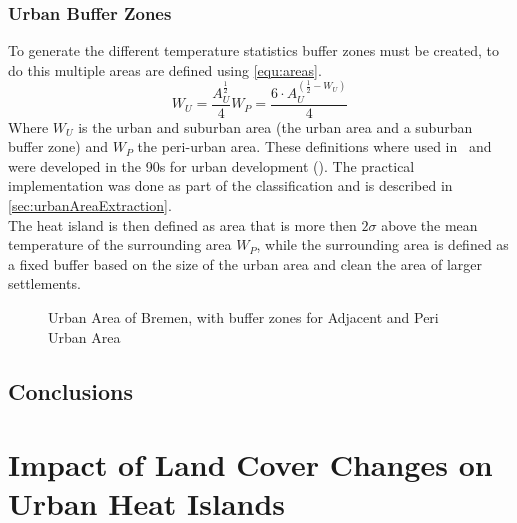 \documentclass[12pt,a4paper, english,twoside]{article}
\begin{document}
    \subsubsection{Urban Buffer Zones}\label{sec:urbanBufferzone}
      To generate the different temperature statistics buffer zones must be created, to do this multiple areas are defined using \cref{equ:areas}.
%
      \begin{equation}\label{equ:areas}
	      W_U = \frac{A_U^{\frac{1}{2}}}{4}
	      W_P = \frac{6\cdot A_U^{(\frac{1}{2}-W_U)}}{4}
      \end{equation}
      Where $W_U$ is the urban and suburban area (the urban area and a suburban buffer zone) and $W_P$ the peri-urban area.
      These definitions where used in~\cite{Sobrino2020} and were developed in the 90s for urban development (\cite{AlkanBala2014}).
      The practical implementation was done as part of the classification and is described in \cref{sec:urbanAreaExtraction}. \\
      The heat island is then defined as area that is more then $2\sigma$ above the mean temperature of the surrounding area $W_P$, while the surrounding area is defined as a fixed buffer based on the size of the urban area and clean the area of larger settlements. 
      \begin{figure}
        
        \caption{Urban Area of Bremen, with buffer zones for Adjacent and Peri Urban Area\label{fig:bufferedBremen}}
      \end{figure}
%
    \subsection{Conclusions}	

%    
\newpage
\section{Impact of Land Cover Changes on Urban Heat Islands}\label{sec:LULC}
\end{document}
